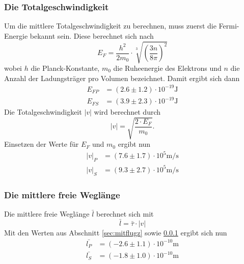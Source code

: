     \subsubsection{Die Totalgeschwindigkeit}
    \label{sec:totgeschw}
      Um die mittlere Totalgeschwindigkeit zu berechnen, muss zuerst die Fermi-Energie bekannt sein. Diese berechnet sich nach
      \begin{equation}
        E_{F} = \frac{h^{2}}{2m_{0}} \cdot \sqrt[3]{\left(\frac{3n}{8 \pi}\right)^{2}}
      \end{equation}
      wobei $h$ die Planck-Konstante, $m_{0}$ die Ruheenergie des Elektrons und $n$ die Anzahl der Ladungsträger pro Volumen bezeichnet. Damit ergibt sich dann
      \begin{align*}
        E_{FP} & = (2.6 \pm 1.2) \cdot 10^{-19} \si{\joule} \\
        E_{FS} & = (3.9 \pm 2.3) \cdot 10^{-19} \si{\joule}
      \end{align*}
      Die Totalgeschwindigkeit $|v|$ wird berechnet durch
      \begin{equation}
        |v| = \sqrt{\frac{2 \cdot E_{F}}{m_{0}}}.
      \end{equation}
      Einsetzen der Werte für $E_{F}$ und $m_{0}$ ergibt nun
      \begin{align*}
        |v|_{P} & = (7.6 \pm 1.7)\cdot 10^{5} \si{\meter\per\second}\\
        |v|_{S} & = (9.3 \pm 2.7)\cdot 10^{5} \si{\meter\per\second}
      \end{align*}
    \subsubsection{Die mittlere freie Weglänge}
      Die mittlere freie Weglänge $\bar{l}$ berechnet sich mit
      \begin{equation}
        \bar{l} = \bar{\tau} \cdot |v|
      \end{equation}
      Mit den Werten aus Abschnitt \ref{sec:mitflugz} sowie \ref{sec:totgeschw} ergibt sich nun
      \begin{align*}
        \bar{l_{P}} & = (-2.6 \pm 1.1)\cdot 10^{-10}  \si{\meter} \\
        \bar{l_{S}} & = (-1.8 \pm 1.0)\cdot 10^{-10}  \si{\meter}
      \end{align*}
